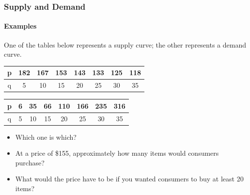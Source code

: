 \documentclass[9pt,xcolor=x11names,compress]{beamer}
\begin{document}
\begin{frame}
\frametitle{Supply and Demand}
\framesubtitle{Examples}
\begin{example}
One of the tables below represents a supply curve; the other represents a demand curve.
\begin{center}
\begin{tabular}{c||c|c|c|c|c|c|c|}
\hline
p & 182 & 167 & 153 & 143 & 133 & 125 & 118  \\
\hline
q & 5 & 10 & 15 & 20 & 25 & 30 & 35 \\
\hline
\end{tabular}

\vspace{0.5cm}
\begin{tabular}{c||c|c|c|c|c|c|c|}
\hline
p & 6 & 35 & 66 & 110 & 166 & 235 & 316  \\
\hline
q & 5 & 10 & 15 & 20 & 25 & 30 & 35 \\
\hline
\end{tabular}
\end{center}
\begin{itemize}
\item Which one is which? 
\item At a price of \$155, approximately how many items would consumers purchase? 
\item What would the price have to be if you wanted consumers to buy at least 20 items? 
\end{itemize}
\end{example}
\end{frame}
\end{document}
